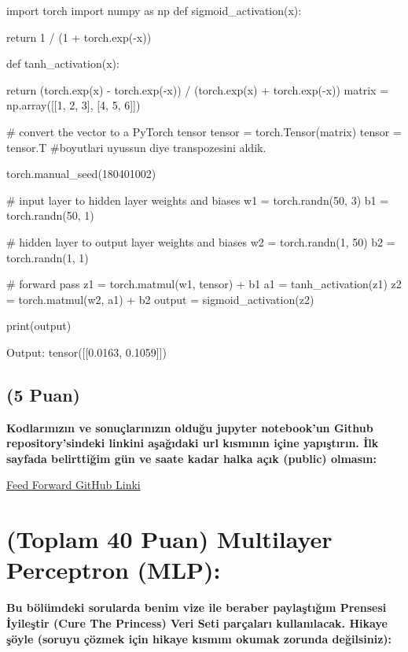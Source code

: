 \documentclass[11pt]{article}
\begin{document}
\begin{python}
import torch
import numpy as np
def sigmoid_activation(x):

  return 1 / (1 + torch.exp(-x))

def tanh_activation(x):
  
  return (torch.exp(x) - torch.exp(-x)) / (torch.exp(x) + torch.exp(-x))
matrix = np.array([[1, 2, 3], [4, 5, 6]])

# convert the vector to a PyTorch tensor
tensor = torch.Tensor(matrix)
tensor = tensor.T    #boyutlari uyussun diye transpozesini aldik.

torch.manual_seed(180401002) 

# input layer to hidden layer weights and biases
w1 = torch.randn(50, 3)
b1 = torch.randn(50, 1)

# hidden layer to output layer weights and biases
w2 = torch.randn(1, 50)
b2 = torch.randn(1, 1)

# forward pass
z1 = torch.matmul(w1, tensor) + b1  
a1 = tanh_activation(z1)
z2 = torch.matmul(w2, a1) + b2
output = sigmoid_activation(z2)

print(output)
\end{python}

Output: tensor([[0.0163, 0.1059]])

\subsection{(5 Puan)} \textbf{Kodlarınızın ve sonuçlarınızın olduğu jupyter notebook'un Github repository'sindeki linkini aşağıdaki url kısmının içine yapıştırın. İlk sayfada belirttiğim gün ve saate kadar halka açık (public) olmasın:}

\href{https://github.com/ilkay-bicici/yapaysiniraglariornekler/blob/83e7c9b6202ea32adf1ece1eeadc6e4ed62ac409/Forward_propagation.ipynb}{Feed Forward GitHub Linki}

\section{(Toplam 40 Puan) Multilayer Perceptron (MLP):} 
\textbf{Bu bölümdeki sorularda benim vize ile beraber paylaştığım Prensesi İyileştir (Cure The Princess) Veri Seti parçaları kullanılacak. Hikaye şöyle (soruyu çözmek için hikaye kısmını okumak zorunda değilsiniz):} 
\end{document}
